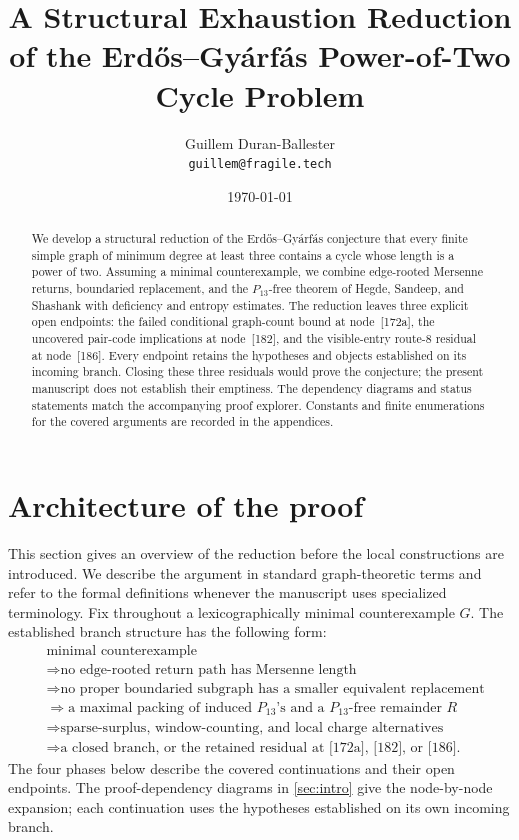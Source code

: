 \documentclass[11pt]{article}
\title{A Structural Exhaustion Reduction of the Erd\H{o}s--Gy\'arf\'as Power-of-Two Cycle Problem}
\author{Guillem Duran-Ballester\\\texttt{guillem@fragile.tech}}
\date{\today}
\begin{document}
\maketitle

\begin{abstract}
We develop a structural reduction of the Erd\H{o}s--Gy\'arf\'as conjecture
that every finite simple graph of minimum degree at least three contains a
cycle whose length is a power of two.  Assuming a minimal counterexample, we
combine edge-rooted Mersenne returns, boundaried replacement, and the
$P_{13}$-free theorem of Hegde, Sandeep, and Shashank with deficiency and
entropy estimates.  The reduction leaves three explicit open endpoints:
the failed conditional graph-count bound at node~[172a], the uncovered
pair-code implications at node~[182], and the visible-entry route-8 residual
at node~[186].  Every endpoint retains the hypotheses and objects established
on its incoming branch.  Closing these three residuals would prove the
conjecture; the present manuscript does not establish their emptiness.
The dependency diagrams and status statements match the accompanying proof
explorer.  Constants and finite enumerations for the covered arguments are
recorded in the appendices.
\end{abstract}

\tableofcontents

\setcounter{section}{-1}
\section{Architecture of the proof}\label{sec:architecture}

This section gives an overview of the reduction before the local
constructions are introduced.  We describe the argument in standard graph-theoretic terms and
refer to the formal definitions whenever the manuscript uses specialized
terminology.  Fix throughout a lexicographically minimal counterexample $G$.
The established branch structure has the following form:
\[
\begin{aligned}
&\text{minimal counterexample}\\
&\Rightarrow \text{no edge-rooted return path has Mersenne length}\\
&\Rightarrow \text{no proper boundaried subgraph has a smaller equivalent replacement}\\
&\Rightarrow \text{a maximal packing of induced }P_{13}\text{'s and a }P_{13}\text{-free remainder }R\\
&\Rightarrow \text{sparse-surplus, window-counting, and local charge alternatives}\\
&\Rightarrow \text{a closed branch, or the retained residual at [172a], [182], or [186].}
\end{aligned}
\]
The four phases below describe the covered continuations and their open
endpoints.  The proof-dependency diagrams in \cref{sec:intro} give the
node-by-node expansion; each continuation uses the hypotheses established
on its own incoming branch.
\end{document}
